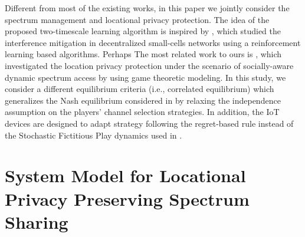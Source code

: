 Different from most of the existing works, in this paper we jointly consider the spectrum management and locational privacy protection. The idea of the proposed two-timescale learning algorithm is inspired by \cite{Bennis13}, which studied the interference mitigation in decentralized small-cells networks using a reinforcement learning based algorithms. Perhaps The most related work to ours is \cite{ZhangGlobe}, which investigated the location privacy protection under the scenario of socially-aware dynamic spectrum access by using game theoretic modeling. In this study, we consider a different equilibrium criteria (i.e., correlated equilibrium) which generalizes the Nash equilibrium considered in \cite{ZhangGlobe} by relaxing the independence assumption on the players' channel selection strategies. In addition, the IoT devices are designed to adapt strategy following the regret-based rule\cite{Hart00asimple} instead of the Stochastic Fictitious Play dynamics used in \cite{ZhangGlobe}. 

\section{System Model for Locational Privacy Preserving Spectrum Sharing}\label{sec:model}



